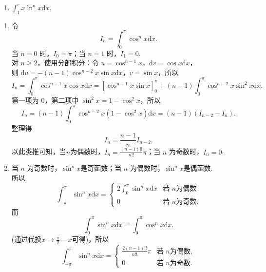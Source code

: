 \begin{enumerate}
\begin{enumerate}
        \item[(e)]$\displaystyle \int_{1}^{e}x\ln^{n}x \mathrm{d}x$.
    \end{enumerate}
    \begin{solution}
        \begin{enumerate}
        \item[(a)] 
        令
        \[
        I_n = \int_{0}^{\pi} \cos^n x \mathrm{d}x.
        \]
        当 $n=0$ 时，$I_0 = \pi$；当 $n=1$ 时，$I_1 = 0$.\\
        对 $n \geq 2$，使用分部积分：令 $u = \cos^{n-1} x$，$\mathrm{d}v = \cos x \mathrm{d}x$，\\
        则 $\mathrm{d}u = -(n-1)\cos^{n-2} x \sin x \mathrm{d}x$，$v = \sin x$，所以
        \[
        I_n = \int_{0}^{\pi} \cos^{n-1} x \cos x \mathrm{d}x = \left[\cos^{n-1} x \sin x\right]_{0}^{\pi} + (n-1) \int_{0}^{\pi} \cos^{n-2} x \sin^2 x \mathrm{d}x.
        \]
        第一项为 $0$，第二项中 $\sin^2 x = 1 - \cos^2 x$，所以
        \[
        I_n = (n-1) \int_{0}^{\pi} \cos^{n-2} x (1 - \cos^2 x) \mathrm{d}x = (n-1)(I_{n-2} - I_n).
        \]
        整理得
        \[
        I_n = \frac{n-1}{n} I_{n-2}.
        \]
        以此类推可知，当$n$为偶数时，$\displaystyle I_n = \frac{(n-1)!!}{n!!} \pi$；当 $n$ 为奇数时，$I_n = 0$.

        \item[(b)]
        当 $n$ 为奇数时，$\sin^n x$是奇函数；当 $n$ 为偶数时，$\sin^n x$是偶函数.\\
        所以
        \[
        \int_{-\pi}^{\pi} \sin^n x \mathrm{d}x = \begin{cases}
            \displaystyle 2 \int_{0}^{\pi} \sin^n x \mathrm{d}x & \text{若 } n \text{为偶数} \\
            0 & \text{若 } n \text{为奇数}.
        \end{cases}
        \]
        而
        \[
        \int_{0}^{\pi} \sin^n x \mathrm{d}x = \int_{0}^{\pi} \cos^n x \mathrm{d}x.
        \] (通过代换$\displaystyle x \to \frac{\pi}{2}-x$可得)，所以
        \[
        \int_{-\pi}^{\pi} \sin^n x \mathrm{d}x = \begin{cases}
            \displaystyle\frac{2(n-1)!!}{n!!} \pi & \text{若 } n \text{为偶数}, \\
            0 & \text{若 } n \text{为奇数}.
        \end{cases}
        \]


\end{enumerate}
\end{solution}
\end{enumerate}
